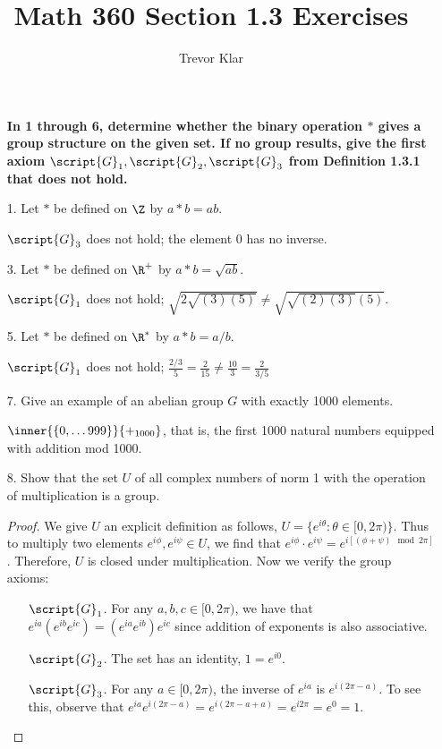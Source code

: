 \documentclass[letterpaper]{article}
\title{Math 360 \linebreak
Section 1.3 Exercises}
\author{Trevor Klar}
\begin{document}
\maketitle

\begin{enumerate}

\item[\phantom{1.}]

\hspace*{-0.6cm}\textbf{In 1 through 6, determine whether the binary operation $*$ gives a group structure on the given set. If no group results, give the first axiom $\script{G}_1, \script{G}_2, \script{G}_3 $ from Definition 1.3.1 that does not hold.}

\item[1.] Let $*$ be defined on $\Z$ by $a*b=ab$. 

\answer $\script{G}_3 $ does not hold; the element 0 has no inverse. 

\item[3.] Let $*$ be defined on $\R^+$ by $a*b=\sqrt{ab}$. 

\answer	$\script{G}_1 $ does not hold; $\sqrt{2\sqrt{(3)(5)}}\neq\sqrt{\sqrt{(2)(3)}(5)}$. 

\item[5.] Let $*$ be defined on $\R^*$ by $a*b=a/b$. 

\answer	$\script{G}_1 $ does not hold; $\frac{2/3}{5}=\frac{2}{15}\neq\frac{10}{3}=\frac{2}{3/5}$

\item[7.] Give an example of an abelian group $G$ with exactly 1000 elements. 

\answer $\inner{\{0, \dots 999\}}{+_{1000}}$, that is, the first 1000 natural numbers equipped with addition mod 1000. 

\item[8.] Show that the set $U$ of all complex numbers of norm 1 with the operation of multiplication is a group. 

\begin{proof}
We give $U$ an explicit definition as follows, $U=\{e^{i\theta}:\theta\in[0,2\pi)\}$. Thus to multiply two elements $e^{i\phi}, e^{i\psi}\in U$, we find that $e^{i\phi}\cdot e^{i\psi}=e^{i[(\phi+\psi)\mod2\pi]}$. Therefore, $U$ is closed under multiplication. Now we verify the group axioms:
	\begin{enumerate}
	\item[$\script{G}_1$.] For any $a,b,c\in [0,2\pi)$, we have that $e^{ia}(e^{ib}e^{ic})=(e^{ia}e^{ib})e^{ic}$ since addition of exponents is also associative. 
	\item[$\script{G}_2$.] The set has an identity, $1=e^{i0}$. 
	\item[$\script{G}_3$.] For any $a\in [0,2\pi)$, the inverse of $e^{ia}$ is $e^{i(2\pi-a)}$. To see this, observe that $e^{ia}e^{i(2\pi-a)}=e^{i(2\pi-a+a)}=e^{i2\pi}=e^0=1$. 
	\end{enumerate}
\end{proof}


\end{enumerate}
\end{document}
